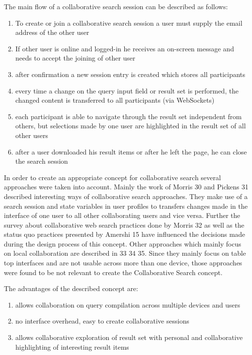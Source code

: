 \documentclass[runningheads,a4paper]{llncs} \usepackage[utf8]{inputenc}
\begin{document}
The main flow of a collaborative search session can be described as follows:
\begin{enumerate}
  \item To create or join a collaborative search session a user must supply the
  email address of the other user
  \item If other user is online and logged-in he receives an on-screen message
  and needs to accept the joining of other user
  \item after confirmation a new session entry is created which stores all
  participants
  \item every time a change on the query input field or result set is performed,
  the changed content is transferred to all participants (via WebSockets)
  \item each participant is able to navigate through the result set independent
  from others, but selections made by one user are highlighted in the result set of all other users
  \item after a user downloaded his result items or after he left the page, he
  can close the search session
\end{enumerate}

In order to create an appropriate concept for collaborative search several
approaches were taken into account. Mainly the work of Morris 30 and Pickens
31 described interesting ways of collaborative search approaches.  They make
use of a search session and state variables in user profiles to transfers
changes made in the interface of one user to all other collaborating users and
vice versa. Further the survey about collaborative web search practices done by
Morris 32 as well as the status quo practices presented by Amershi 15 have
influenced the decisions made during the design process of this concept. Other
approaches which mainly focus on local collaboration are described in 33 34
35. Since they mainly focus on table top interfaces and are not usable across
more than one device, those approaches were found to be not relevant to create
the Collaborative Search concept.

The advantages of the described concept are:
\begin{enumerate}
  \item allows collaboration on query compilation across multiple devices and
  users
  \item no interface overhead, easy to create collaborative sessions
  \item allows collaborative exploration of result set with personal and
  collaborative highlighting of interesting result items
\end{enumerate}
\end{document}

